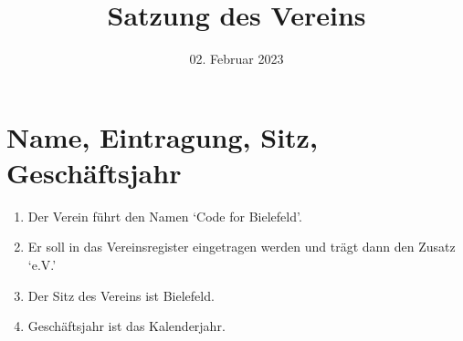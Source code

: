 \documentclass[12pt,a4paper,draft]{article}
\title{Satzung des Vereins \unsername} %
\author{\unsername}
\date{02. Februar 2023} %
\newcommand{\unsername}{Code for Bielefeld}
\begin{document}
\maketitle
\tableofcontents

\section{Name, Eintragung, Sitz, Geschäftsjahr}
\begin{enumerate}
\item Der Verein führt den Namen `\unsername'.

\item Er soll in das Vereinsregister eingetragen werden und trägt dann den 
Zusatz `e.V.'

\item Der Sitz des Vereins ist Bielefeld. %

\item Geschäftsjahr ist das Kalenderjahr.
\end{enumerate}
\end{document}
